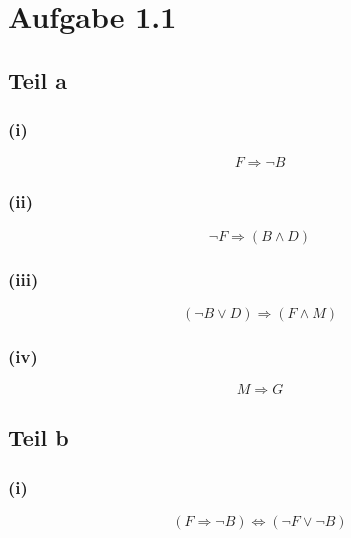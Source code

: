\documentclass[10pt,a4paper]{article}
\begin{document}
\section{Aufgabe 1.1}

\subsection{Teil a}

\subsubsection{(i)}

\begin{equation}
  F \Rightarrow \lnot B
\end{equation}

\subsubsection{(ii)}

\begin{equation}
  \lnot F \Rightarrow (B \land D)
\end{equation}

\subsubsection{(iii)}

\begin{equation}
  (\lnot B \lor D) \Rightarrow (F \land M)
\end{equation}

\subsubsection{(iv)}

\begin{equation}
  M \Rightarrow G
\end{equation}

\subsection{Teil b}

\subsubsection{(i)}

\begin{equation}
  (F \Rightarrow \lnot B) \Leftrightarrow (\lnot F \lor \lnot B)
\end{equation}
\end{document}
